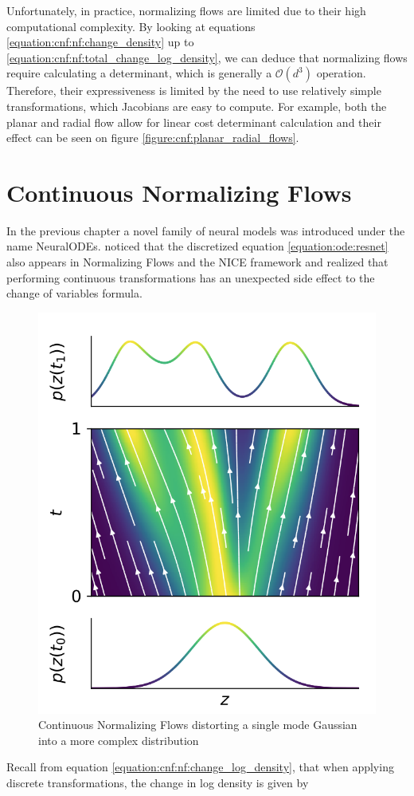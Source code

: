Unfortunately, in practice, normalizing flows are limited due to their high computational complexity. By looking at equations \ref{equation:cnf:nf:change_density} up to \ref{equation:cnf:nf:total_change_log_density}, we can deduce that normalizing flows require calculating a determinant, which is generally a $ \mathcal{O}(d^3) $ operation. Therefore, their expressiveness is limited by the need to use relatively simple transformations, which Jacobians are easy to compute. For example, both the planar and radial flow allow for linear cost determinant calculation and their effect can be seen on figure \ref{figure:cnf:planar_radial_flows}.

\section{Continuous Normalizing Flows}
\label{section:cnf:cnf}

In the previous chapter a novel family of neural models was introduced under the name NeuralODEs. \citet{chen2018neural} noticed that the discretized equation \ref{equation:ode:resnet} also appears in Normalizing Flows \citep{rezende2015variational} and the NICE framework \citep{dinh2014nice} and realized that performing continuous transformations has an unexpected side effect to the change of variables formula.

\begin{figure}[ht]
      \centering
      \includegraphics[width=0.5\columnwidth]{figures/cnf_transformations.png}
      \caption{Continuous Normalizing Flows distorting a single mode Gaussian into a more complex distribution \citep{grathwohl2018ffjord}}
      \label{figure:cnf:cnf_transformations}
\end{figure}

Recall from equation \ref{equation:cnf:nf:change_log_density}, that when applying discrete transformations, the change in log density is given by

